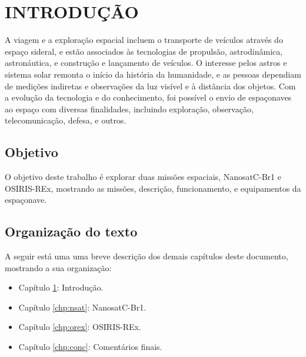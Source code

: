 
\chapter{INTRODUÇÃO}
\label{chp:intr}


A viagem e a exploração espacial incluem o transporte de veículos através do espaço sideral, e estão associados às tecnologias de propulsão, astrodinâmica, astronáutica, e construção e lançamento de veículos. O interesse pelos astros e sistema solar remonta o início da história da humanidade, e as pessoas dependiam de medições indiretas e observações da luz visível e à distância dos objetos. Com a evolução da tecnologia e do conhecimento, foi possível o envio de espaçonaves ao espaço com diversas finalidades, incluindo exploração, observação, telecomunicação, defesa, e outros.



\section{Objetivo}

O objetivo deste trabalho é explorar duas missões espaciais, NanosatC-Br1 e OSIRIS-REx, mostrando as missões, descrição, funcionamento, e equipamentos da espaçonave.



\section{Organização do texto}

A seguir está uma uma breve descrição dos demais capítulos deste documento, mostrando
a sua organização:



\begin{itemize}


\item Capítulo \ref{chp:intr}: Introdução.

\item Capítulo \ref{chp:nsat}: NanosatC-Br1.

\item Capítulo \ref{chp:orex}: OSIRIS-REx.

\item Capítulo \ref{chp:conc}: Comentários finais.


\end{itemize}



